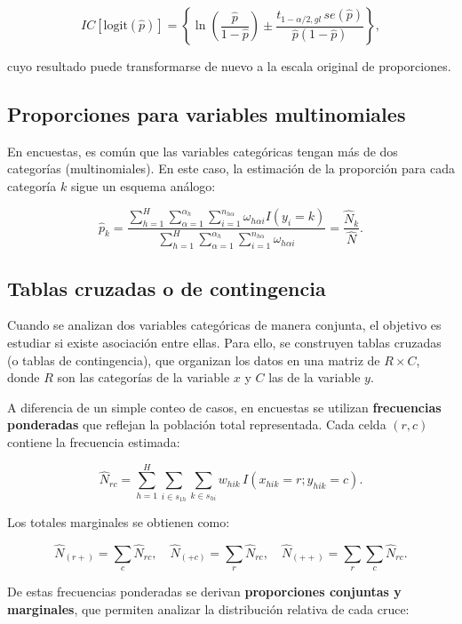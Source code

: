 \documentclass[
  spanish,
  12pt,
]{book}
\begin{document}
\[
IC[\text{logit}(\hat{p})] = \left\{ \ln\left(\frac{\hat{p}}{1-\hat{p}}\right) \pm \frac{t_{1-\alpha/2,gl}\,se(\hat{p})}{\hat{p}(1-\hat{p})}\right\},
\]

cuyo resultado puede transformarse de nuevo a la escala original de proporciones.

\subsection{Proporciones para variables multinomiales}\label{proporciones-para-variables-multinomiales}

En encuestas, es común que las variables categóricas tengan más de dos categorías (multinomiales). En este caso, la estimación de la proporción para cada categoría \(k\) sigue un esquema análogo:

\[
\hat{p}_{k} = \frac{\sum_{h=1}^{H}\sum_{\alpha=1}^{\alpha_{h}}\sum_{i=1}^{n_{h\alpha}} \omega_{h\alpha i}I(y_{i}=k)}{\sum_{h=1}^{H}\sum_{\alpha=1}^{\alpha_{h}}\sum_{i=1}^{n_{h\alpha}} \omega_{h\alpha i}}
= \frac{\hat{N}_{k}}{\hat{N}}.
\]

\subsection{Tablas cruzadas o de contingencia}\label{tablas-cruzadas-o-de-contingencia}

Cuando se analizan dos variables categóricas de manera conjunta, el objetivo es estudiar si existe asociación entre ellas. Para ello, se construyen tablas cruzadas (o tablas de contingencia), que organizan los datos en una matriz de \(R \times C\), donde \(R\) son las categorías de la variable \(x\) y \(C\) las de la variable \(y\).

A diferencia de un simple conteo de casos, en encuestas se utilizan \textbf{frecuencias ponderadas} que reflejan la población total representada. Cada celda \((r,c)\) contiene la frecuencia estimada:

\[
\hat{N}_{rc} = \sum_{h=1}^{H}\sum_{i \in s_{1h}}\sum_{k \in s_{hi}} w_{hik}\,I(x_{hik}=r; y_{hik}=c).
\]

Los totales marginales se obtienen como:

\[
\hat{N}_{(r+)} = \sum_{c} \hat{N}_{rc}, \quad \hat{N}_{(+c)} = \sum_{r} \hat{N}_{rc}, \quad \hat{N}_{(++)} = \sum_{r}\sum_{c} \hat{N}_{rc}.
\]

De estas frecuencias ponderadas se derivan \textbf{proporciones conjuntas y marginales}, que permiten analizar la distribución relativa de cada cruce:
\end{document}
